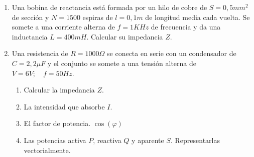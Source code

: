 \documentclass[../main]{subfiles}
\begin{document}
\begin{enumerate}
\begin{enumerate}
\end{enumerate}
\item Una bobina de reactancia está formada por un hilo de cobre de $S=0,5mm^2$ de sección y $N=1500$
espiras de $l=0,1m$ de longitud media cada vuelta. Se somete a una corriente alterna de $f=1KHz$ de
frecuencia y da una inductancia $L=400mH$. Calcular su impedancia $Z$.
\item Una resistencia de $R=1000\Omega$ se conecta en serie con un condensador de $C=2,2\mu F$ y el conjunto
se somete a una tensión alterna de $V=6V ;\quad f=50Hz$.
\begin{enumerate}
\item Calcular la impedancia $Z$.
\item La intensidad que absorbe $I$.
\item El factor de potencia. $\cos(\varphi)$
\item Las potencias  activa $P$, reactiva $Q$ y aparente $S$. Representarlas vectorialmente.
\end{enumerate}


\end{enumerate}
\newpage
\end{document}
